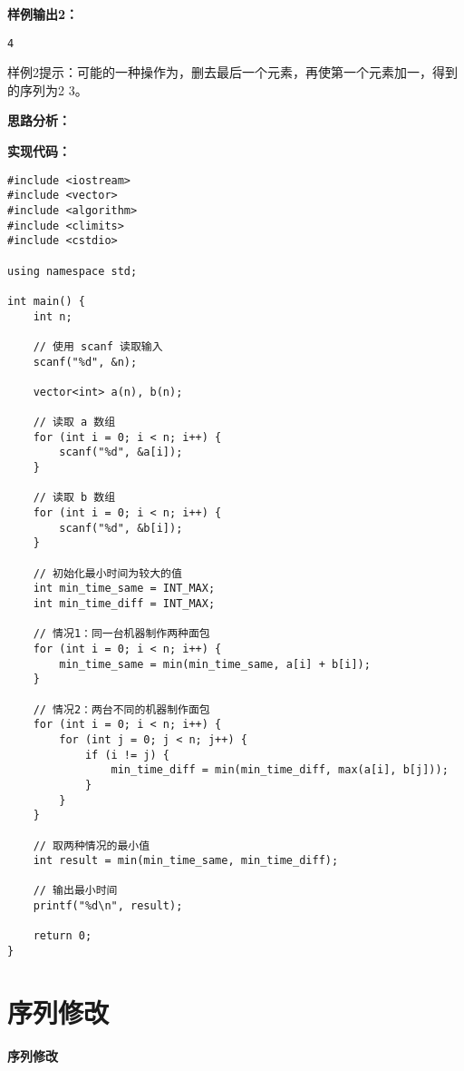 \documentclass[a4paper]{ctexart}
\begin{document}
\noindent\textbf{样例输出2：}
\lstset{numbers=none}
\begin{lstlisting}
4
\end{lstlisting}
\lstset{numbers=left}

样例2提示：可能的一种操作为，删去最后一个元素，再使第一个元素加一，得到的序列为2 3。

\vspace{10pt}

\noindent\textbf{思路分析：}




\noindent\textbf{实现代码：}

\begin{lstlisting}
#include <iostream>
#include <vector>
#include <algorithm>
#include <climits>
#include <cstdio>

using namespace std;

int main() {
	int n;
	
	// 使用 scanf 读取输入
	scanf("%d", &n);
	
	vector<int> a(n), b(n);
	
	// 读取 a 数组
	for (int i = 0; i < n; i++) {
		scanf("%d", &a[i]);
	}
	
	// 读取 b 数组
	for (int i = 0; i < n; i++) {
		scanf("%d", &b[i]);
	}
	
	// 初始化最小时间为较大的值
	int min_time_same = INT_MAX;
	int min_time_diff = INT_MAX;
	
	// 情况1：同一台机器制作两种面包
	for (int i = 0; i < n; i++) {
		min_time_same = min(min_time_same, a[i] + b[i]);
	}
	
	// 情况2：两台不同的机器制作面包
	for (int i = 0; i < n; i++) {
		for (int j = 0; j < n; j++) {
			if (i != j) {
				min_time_diff = min(min_time_diff, max(a[i], b[j]));
			}
		}
	}
	
	// 取两种情况的最小值
	int result = min(min_time_same, min_time_diff);
	
	// 输出最小时间
	printf("%d\n", result);
	
	return 0;
}
\end{lstlisting}

\newpage

\section{序列修改}

\begin{center}
	\Large \textbf{序列修改}
\end{center}
\end{document}
